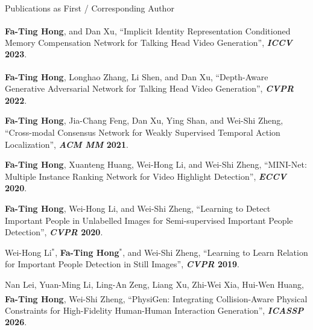 \documentclass{resume} %
\newcommand{\pubtopic}[2]{\par\needspace{3\baselineskip}\vspace{2pt}\noindent\hspace{8pt}{\color{#1}\rule[-1pt]{2.5pt}{9pt}}\hspace{5pt}{\small\bfseries\color{#1}#2}\par\vspace{1pt}}
\begin{document}
\begin{rSection}{Publications as First / Corresponding Author}
\begin{enumerate}[label={\color{topicVG}[P\arabic*]}, start=1, leftmargin=26pt, labelsep=5pt, itemsep=0pt, parsep=0pt, topsep=0pt]
    \item \textbf{Fa-Ting Hong}, and Dan Xu{\textsuperscript{\Letter}},
    ``Implicit Identity Representation Conditioned Memory Compensation Network for Talking Head Video Generation'', \textbf{\textit{ICCV} 2023}.

    \item \textbf{Fa-Ting Hong}, Longhao Zhang, Li Shen, and Dan Xu{\textsuperscript{\Letter}},
    ``Depth-Aware Generative Adversarial Network for Talking Head Video Generation'', \textbf{\textit{CVPR} 2022}.

    \item \textbf{Fa-Ting Hong}, Jia-Chang Feng, Dan Xu, Ying Shan, and Wei-Shi Zheng,
    ``Cross-modal Consensus Network for Weakly Supervised Temporal Action Localization'', \textbf{\textit{ACM MM} 2021}.

    \item \textbf{Fa-Ting Hong}, Xuanteng Huang, Wei-Hong Li, and Wei-Shi Zheng,
    ``MINI-Net: Multiple Instance Ranking Network for Video Highlight Detection'', \textbf{\textit{ECCV} 2020}.

    \item \textbf{Fa-Ting Hong}, Wei-Hong Li, and Wei-Shi Zheng,
    ``Learning to Detect Important People in Unlabelled Images for Semi-supervised Important People Detection'', \textbf{\textit{CVPR} 2020}.

    \item Wei-Hong Li$^*$, \textbf{Fa-Ting Hong}$^*$, and Wei-Shi Zheng,
    ``Learning to Learn Relation for Important People Detection in Still Images'', \textbf{\textit{CVPR} 2019}.

\end{enumerate}
\pubtopic{topicMO}{Human-centric Motion}
\begin{enumerate}[label={\color{topicMO}[P\arabic*]}, start=11, leftmargin=26pt, labelsep=5pt, itemsep=0pt, parsep=0pt, topsep=0pt]
    \item Nan Lei, Yuan-Ming Li, Ling-An Zeng, Liang Xu, Zhi-Wei Xia, Hui-Wen Huang, \textbf{Fa-Ting Hong}{\textsuperscript{\Letter}}, Wei-Shi Zheng,
    ``PhysiGen: Integrating Collision-Aware Physical Constraints for High-Fidelity Human-Human Interaction Generation'', \textbf{\textit{ICASSP} 2026}.

\end{enumerate}
\end{rSection}
\end{document}
